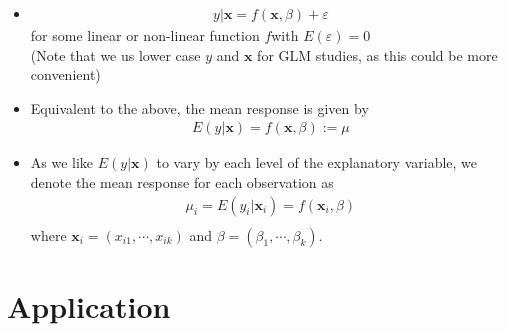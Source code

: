 \documentclass[12pt]{article}
\begin{document}
\begin{itemize}
\item
\begin{align}
y|\mathbf{ x} = f(\mathbf{ x},\beta) + \varepsilon
\end{align}
for some linear or non-linear function $f$with  $E(\varepsilon)=0$\\
(Note that we us lower case $y$ and $\mathbf{ x}$ for GLM studies, as this could be more convenient)
  \item Equivalent to the above, the mean response is given by
\begin{align}
E(y|\mathbf{ x})=f(\mathbf{ x},\beta):=\mu
\end{align}
  \item As we like $E(y|\mathbf{ x})$ to vary by each level of the explanatory variable, we denote the mean response for each observation as
\begin{align}
  \mu_i=E(y_i|\mathbf{ x}_i)=f(\mathbf{ x}_i,\beta)\\
\end{align}
where $\mathbf{ x}_i=(x_{i1},\cdots,x_{ik})$ and $\beta=(\beta_1,\cdots,\beta_k)$.
\end{itemize}



\section{Application}

\section{}
\end{document}
